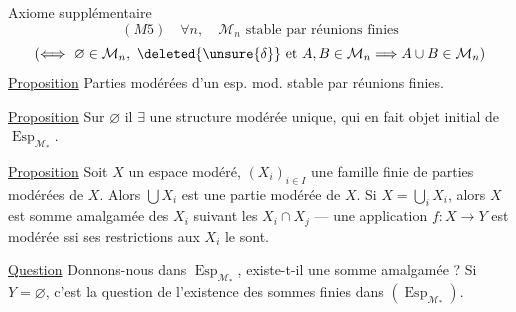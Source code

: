 Axiome supplémentaire
\[
 (M5)\quad \forall n,\quad \mathcal M_n\text{ stable par réunions finies}
\]
\[
 (\Longleftrightarrow\ \varnothing\in\mathcal M_n,\ \deleted{\unsure{\delta}}\text{ et }A,B\in\mathcal M_n\Longrightarrow A\cup B\in\mathcal M_n)
\]
\uline{Proposition} Parties modérées d'un esp. mod. stable par réunions finies.

\uline{Proposition} Sur $\varnothing$ il $\exists$ une structure modérée unique, qui en fait objet initial de $\operatorname{Esp}_{\mathcal M_*}$.

\uline{Proposition} Soit $X$ un espace modéré, $(X_i)_{i\in I}$ une famille finie de parties modérées de $X$. Alors $\bigcup X_i$ est une partie modérée de $X$. Si $X=\bigcup_iX_i$, alors $X$ est somme amalgamée des $X_i$ suivant les $X_i\cap X_j$ --- une application $f:X\longrightarrow Y$  est modérée ssi ses restrictions aux $X_i$ le sont.

\uline{Question} Donnons-nous
dans $\operatorname{Esp}_{\mathcal M_*}$, existe-t-il une somme amalgamée ? Si $Y=\varnothing$, c'est la question de l'existence des sommes finies dans $(\operatorname{Esp}_{\mathcal M_*})$.
